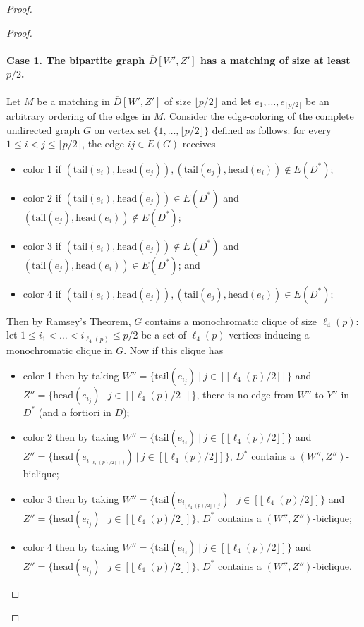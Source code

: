 \documentclass[a4paper,11pt]{article}
\theoremstyle{plain}
\newtheorem{identification rule}{Identification Rule}
\theoremstyle{definition}
\theoremstyle{remark}
\newenvironment{claimproof}{\begin{proof}\renewcommand{\qedsymbol}{\claimqed}}{\end{proof}\renewcommand{\qedsymbol}{\plainqed}}
\let\plainqed\qedsymbol
\newcommand{\claimqed}{$\lrcorner$}
\newcommand{\head}{\text{head}}
\newcommand{\tail}{\text{tail}}
\begin{document}
\begin{proof}
\begin{claimproof}
\paragraph{Case 1. The bipartite graph $\overline{D}[W',Z']$ has a matching of size at least $p/2$.} Let $M$ be a matching in $\overline{D}[W',Z']$ of size $\lfloor p/2 \rfloor$ and let $e_1,\ldots,e_{\lfloor p/2 \rfloor}$ be an arbitrary ordering of the edges in $M$. Consider the edge-coloring of the complete undirected graph $G$ on vertex set $\{1,\ldots, \lfloor p/2 \rfloor\}$ defined as follows: for every $1 \leq i < j \leq \lfloor p/2 \rfloor$, the edge $ij \in E(G)$ receives
\begin{itemize}
\item color 1 if $(\tail(e_i),\head(e_j)),(\tail(e_j),\head(e_i)) \notin E(D^*)$;
\item color 2 if $(\tail(e_i),\head(e_j)) \in E(D^*)$ and $(\tail(e_j),\head(e_i)) \notin E(D^*)$;
\item color 3 if $(\tail(e_i),\head(e_j)) \notin E(D^*)$ and $(\tail(e_j),\head(e_i)) \in E(D^*)$; and
\item color 4 if $(\tail(e_i),\head(e_j)),(\tail(e_j),\head(e_i)) \in E(D^*)$;
\end{itemize}
Then by Ramsey's Theorem, $G$ contains a monochromatic clique of size $\ell_4(p)$: let $1 \leq i_1 < \ldots < i_{\ell_4(p)} \leq p/2$ be a set of $\ell_4(p)$ vertices inducing a monochromatic clique in $G$. Now if this clique has
\begin{itemize}
\item color 1 then by taking $W'' = \{\tail(e_{i_j})~|~j \in [\lfloor \ell_4(p)/2 \rfloor]\}$ and $Z'' = \{\head(e_{i_j})~|~j \in [\lfloor \ell_4(p)/2 \rfloor]\}$, there is no edge from $W''$ to $Y''$ in $D^*$ (and a fortiori in $D$);
\item color 2 then by taking $W'' = \{\tail(e_{i_j})~|~j \in [\lfloor \ell_4(p)/2 \rfloor]\}$ and $Z'' = \{\head(e_{i_{\lfloor \ell_4(p)/2 \rfloor + j}})~|~j \in [\lfloor \ell_4(p)/2 \rfloor]\}$, $D^*$ contains a $(W'',Z'')$-biclique;
\item color 3 then by taking $W'' = \{\tail(e_{i_{\lfloor \ell_4(p)/2 \rfloor + j}})~|~j \in [\lfloor \ell_4(p)/2 \rfloor]\}$ and $Z'' = \{\head(e_{i_j})~|~j \in [\lfloor \ell_4(p)/2 \rfloor]\}$, $D^*$ contains a $(W'',Z'')$-biclique;
\item color 4 then by taking $W'' = \{\tail(e_{i_j})~|~j \in [\lfloor \ell_4(p)/2 \rfloor]\}$ and $Z'' = \{\head(e_{i_j})~|~j \in [\lfloor \ell_4(p)/2 \rfloor]\}$, $D^*$ contains a $(W'',Z'')$-biclique.
\end{itemize}


\end{claimproof}
\end{proof}
\end{document}
